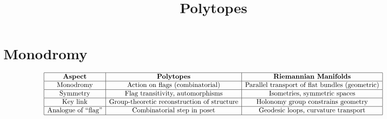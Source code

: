 



\title{Polytopes}
\maketitle

\label{section-phantom}

\tableofcontents

\section{Monodromy}
\label{section-monodromy}

\[
\begin{array}{|c|c|c|}
\hline
\textbf{Aspect} & \textbf{Polytopes} & \textbf{Riemannian Manifolds} \\
\hline
\text{Monodromy} & \text{Action on flags (combinatorial)} & \text{Parallel transport of flat bundles (geometric)} \\
\hline
\text{Symmetry} & \text{Flag transitivity, automorphisms} & \text{Isometries, symmetric spaces} \\
\hline
\text{Key link} & \text{Group-theoretic reconstruction of structure} & \text{Holonomy group constrains geometry} \\
\hline
\text{Analogue of ``flag''} & \text{Combinatorial step in poset} & \text{Geodesic loops, curvature transport} \\
\hline
\end{array}
\]







